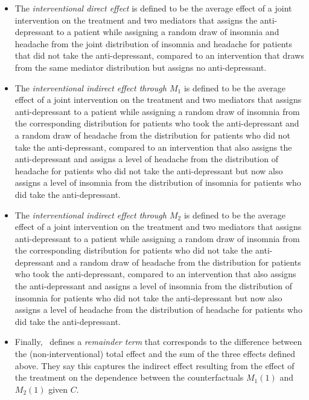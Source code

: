 \begin{itemize}[noitemsep,topsep=0pt]
\item The \textit{interventional direct effect} is defined to be the average effect of a 
joint intervention on the treatment and two mediators that assigns the anti-depressant to
a patient while assigning a random draw of insomnia and headache from the joint distribution 
of insomnia and headache for patients that did not take the anti-depressant, compared to an 
intervention that draws from the same mediator distribution but assigns no anti-depressant. 
\item The \textit{interventional indirect effect through $M_{1}$} is defined to be the average effect
of a joint intervention on the treatment and two mediators that assigns anti-depressant to
a patient while assigning a random draw of insomnia from the corresponding distribution for patients 
who took the anti-depressant and a random draw of headache from the distribution for patients
who did not take the anti-depressant, compared to an 
intervention that also assigns the anti-depressant and assigns a level of headache from the 
distribution of headache for patients who did not take the anti-depressant but now also 
assigns a level of insomnia from the distribution of insomnia for patients who did take the 
anti-depressant. 
\item The \textit{interventional indirect effect through $M_{2}$} is defined to be the average effect
of a joint intervention on the treatment and two mediators that assigns anti-depressant to
a patient while assigning a random draw of insomnia from the corresponding distribution for patients 
who did not take the anti-depressant and a random draw of headache from the distribution for patients
who took the anti-depressant, compared to an 
intervention that also assigns the anti-depressant and assigns a level of insomnia from the 
distribution of insomnia for patients who did not take the anti-depressant but now also 
assigns a level of headache from the distribution of headache for patients who did take the 
anti-depressant. 
\item Finally,~\cite{vansteelandtdaniel2017} defines a \textit{remainder term} that corresponds to the 
difference between the (non-interventional) total effect and the sum of the three effects defined 
above. They say this captures the indirect effect resulting from the effect of the treatment on
the dependence between the counterfactuals $M_{1}(1)$ and $M_{2}(1)$ given $C$. 
\end{itemize}

